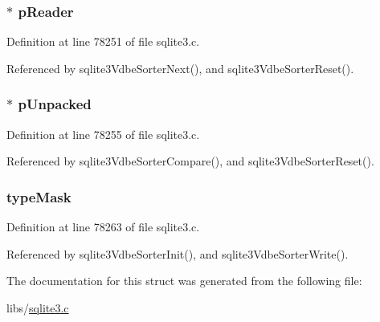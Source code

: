 \subsubsection[{p\+Reader}]{$\ast$ p\+Reader}\label{struct_vdbe_sorter_a3313718acd02fe735e372faedbf6e369}


Definition at line 78251 of file sqlite3.\+c.



Referenced by sqlite3\+Vdbe\+Sorter\+Next(), and sqlite3\+Vdbe\+Sorter\+Reset().

\hypertarget{struct_vdbe_sorter_a3c35478dbef83c35370e3230491c4a87}{}
\subsubsection[{p\+Unpacked}]{$\ast$ p\+Unpacked}\label{struct_vdbe_sorter_a3c35478dbef83c35370e3230491c4a87}


Definition at line 78255 of file sqlite3.\+c.



Referenced by sqlite3\+Vdbe\+Sorter\+Compare(), and sqlite3\+Vdbe\+Sorter\+Reset().

\hypertarget{struct_vdbe_sorter_a00cac7e718b98d0a019a2123af7c17bb}{}
\subsubsection[{type\+Mask}]{ type\+Mask}\label{struct_vdbe_sorter_a00cac7e718b98d0a019a2123af7c17bb}


Definition at line 78263 of file sqlite3.\+c.



Referenced by sqlite3\+Vdbe\+Sorter\+Init(), and sqlite3\+Vdbe\+Sorter\+Write().



The documentation for this struct was generated from the following file\+:\begin{DoxyCompactItemize}
\item 
libs/\hyperlink{sqlite3_8c}{sqlite3.\+c}\end{DoxyCompactItemize}
